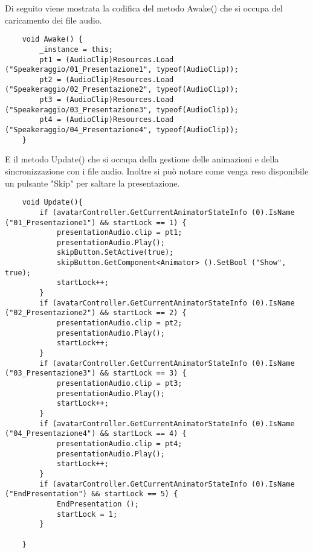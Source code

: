 Di seguito viene mostrata la codifica del metodo Awake() che si occupa del caricamento dei file audio.
\begin{lstlisting}
	void Awake() {
		_instance = this;
		pt1 = (AudioClip)Resources.Load ("Speakeraggio/01_Presentazione1", typeof(AudioClip));
		pt2 = (AudioClip)Resources.Load ("Speakeraggio/02_Presentazione2", typeof(AudioClip));
		pt3 = (AudioClip)Resources.Load ("Speakeraggio/03_Presentazione3", typeof(AudioClip));
		pt4 = (AudioClip)Resources.Load ("Speakeraggio/04_Presentazione4", typeof(AudioClip));
	}
\end{lstlisting}

E il metodo Update() che si occupa della gestione delle animazioni e della sincronizzazione con i file audio. Inoltre si pu\`o notare come venga reso disponibile un pulsante "Skip" per saltare la presentazione.
\begin{lstlisting}
	void Update(){
		if (avatarController.GetCurrentAnimatorStateInfo (0).IsName ("01_Presentazione1") && startLock == 1) {
			presentationAudio.clip = pt1;
			presentationAudio.Play();
			skipButton.SetActive(true);
			skipButton.GetComponent<Animator> ().SetBool ("Show", true);
			startLock++;
		}
		if (avatarController.GetCurrentAnimatorStateInfo (0).IsName ("02_Presentazione2") && startLock == 2) {
			presentationAudio.clip = pt2;
			presentationAudio.Play();
			startLock++;
		}
		if (avatarController.GetCurrentAnimatorStateInfo (0).IsName ("03_Presentazione3") && startLock == 3) {
			presentationAudio.clip = pt3;
			presentationAudio.Play();
			startLock++;
		}
		if (avatarController.GetCurrentAnimatorStateInfo (0).IsName ("04_Presentazione4") && startLock == 4) {
			presentationAudio.clip = pt4;
			presentationAudio.Play();
			startLock++;
		}
		if (avatarController.GetCurrentAnimatorStateInfo (0).IsName ("EndPresentation") && startLock == 5) {
			EndPresentation ();
			startLock = 1;
		}
	
	}
\end{lstlisting}

